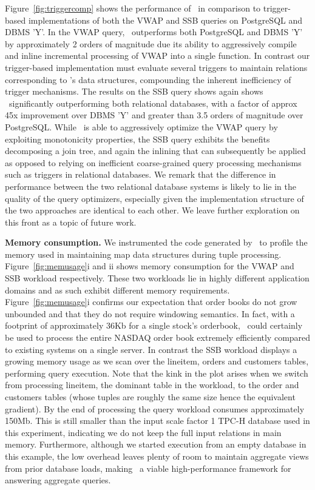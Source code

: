 Figure~\ref{fig:triggercomp} shows the performance of \compiler\ in comparison to
trigger-based implementations of both the VWAP and SSB queries on PostgreSQL and
DBMS 'Y'. In the VWAP query, \compiler\ outperforms both PostgreSQL and DBMS 'Y' by
approximately 2 orders of magnitude due its ability to aggressively compile and
inline incremental processing of VWAP into a single function. In contrast our
trigger-based implementation must evaluate several triggers to maintain relations
corresponding to \compiler's data structures, compounding the inherent
inefficiency of trigger mechanisms. The results on the SSB query shows again
shows \compiler\ significantly outperforming both relational databases, with a
factor of approx 45x improvement over DBMS 'Y' and greater than 3.5 orders of
magnitude over PostgreSQL. While \compiler\ is able to aggressively optimize the
VWAP query by exploiting monotonicity properties, the SSB query exhibits the
benefits decomposing a join tree, and again the inlining that can subsequently be
applied as opposed to relying on inefficient coarse-grained query processing
mechanisms such as triggers in relational databases. We remark that the
difference in performance between the two relational database systems is likely
to lie in the quality of the query optimizers, especially given the
implementation structure of the two approaches are identical to each other. We
leave further exploration on this front as a topic of future work.


\textbf{Memory consumption.}
We instrumented the code generated by \compiler\ to profile the memory used in
maintaining map data structures during tuple processing.
Figure~\ref{fig:memusage}i and ii shows memory consumption for the VWAP
and SSB workload respectively. These two workloads lie in highly different
application domains and as such exhibit different memory requirements.
Figure~\ref{fig:memusage}i confirms our expectation that order books do not
grow unbounded and that they do not require windowing semantics. In fact, with
a footprint of approximately 36Kb for a single stock's orderbook, \compiler\
could certainly be used to process the entire NASDAQ order book extremely
efficiently compared to existing systems on a single server.
In contrast the SSB workload displays a growing memory usage as we scan over the
lineitem, orders and customers tables, performing query execution. Note that the
kink in the plot arises when we switch from processing lineitem, the dominant
table in the workload, to the order and customers tables (whose tuples are
roughly the same size hence the equivalent gradient). By the end of processing
the query workload consumes approximately 150Mb. This is still smaller than the
input scale factor 1 TPC-H database used in this experiment, indicating we do
not keep the full input relations in main memory. Furthermore, although we
started execution from an empty database in this example, the low overhead
leaves plenty of room to maintain aggregate views from prior database loads,
making \compiler\ a viable high-performance framework for answering aggregate
queries.

